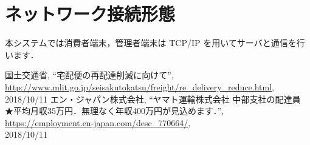 \documentclass[a4j,titlepage]{jarticle}
\begin{document}
\section{ネットワーク接続形態}
本システムでは消費者端末，管理者端末は TCP/IP を用いてサーバと通信を行います．




\begin{thebibliography}{9}

国土交通省,
\newblock ``宅配便の再配達削減に向けて'',\\
\newblock \url{http://www.mlit.go.jp/seisakutokatsu/freight/re_delivery_reduce.html}, \\
2018/10/11
エン・ジャパン株式会社,
\newblock ``ヤマト運輸株式会社 中部支社の配達員　★平均月収35万円．無理なく年収400万円が見込めます．'',\\
\newblock \url{https://employment.en-japan.com/desc_770664/}, \\
2018/10/11
\end{thebibliography}
\end{document}
